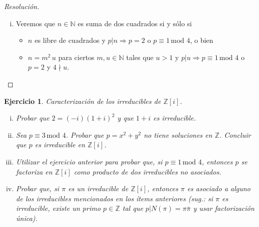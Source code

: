 \documentclass[a4paper,11pt]{article}
\newcommand{\Zm}[1]{\ensuremath{\mathbb{Z}[#1]}}
\newcommand{\Cong}[3]{\ensuremath{#1 \equiv #2 \, \textrm{mod } #3}}
\newcommand{\Div}[2]{\ensuremath{#1 | #2}}
\newtheorem*{ej}{Ejercicio}
\begin{document}
\begin{proof}[Resoluci\'on]
\begin{enumerate}[i.]
\item Veremos que $n \in \mathbb{N}$ es suma de dos cuadrados si y sólo si
\begin{itemize}
    \item $n$ es libre de cuadrados y $\Div{p}{n} \Rightarrow p = 2$ o \Cong{p}{1}{4}, o bien
    \item $n = m^2 \, u$ para ciertos $m, u \in \mathbb{N}$ tales que 
    $u > 1$ y $\Div{p}{u} \Rightarrow \Cong{p}{1}{4}$ o $p = 2$ y $4 \nmid u$.
\end{itemize}

\end{enumerate}

\end{proof}


\begin{ej} 
Caracterización de los irreducibles de \Zm{i}.

\begin{enumerate}[i.]
    \item  Probar que $2 = (-i)(1+i)^2$ y que $1+i$ es irreducible.

    \item Sea \Cong{p}{3}{4}. Probar que $p = x^2 + y^2$ no tiene soluciones
    en $\mathbb{Z}$. Concluir que $p$ es irreducible en \Zm{i}.

    \item Utilizar el ejercicio anterior para probar que, si \Cong{p}{1}{4}, entonces
    $p$ se factoriza en \Zm{i} como producto de dos irreducibles no asociados.

    \item Probar que, si $\pi$ es un irreducible de \Zm{i}, entonces $\pi$ es asociado
    a alguno de los irreducibles mencionados en los ítems anteriores (sug.: si $\pi$ es
    irreducible, existe un primo $p \in \mathbb{Z}$ tal que \Div{p}{N(\pi) = \pi \bar{\pi}}
    y usar factorización única).
\end{enumerate}
\end{ej}
\end{document}
